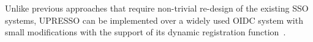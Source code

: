 



Unlike previous approaches that require non-trivial re-design of the existing SSO systems, UPRESSO can be implemented over a widely used OIDC system with small modifications with the support of its dynamic registration function~\cite{DynamicRegistration}.









